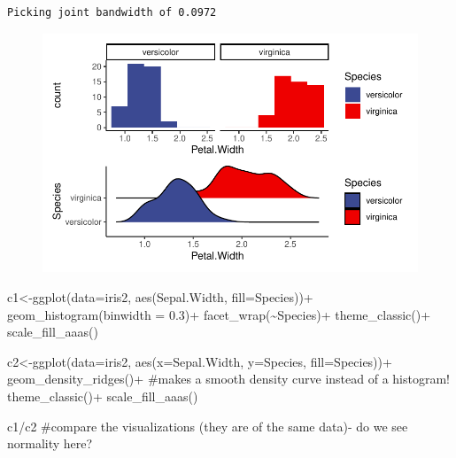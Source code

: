\documentclass[
  letterpaper,
  DIV=11,
  numbers=noendperiod]{scrartcl}
\newenvironment{Shaded}{\begin{snugshade}}{\end{snugshade}}
\newcommand{\AttributeTok}[1]{\textcolor[rgb]{0.40,0.45,0.13}{#1}}
\newcommand{\CommentTok}[1]{\textcolor[rgb]{0.37,0.37,0.37}{#1}}
\newcommand{\FloatTok}[1]{\textcolor[rgb]{0.68,0.00,0.00}{#1}}
\newcommand{\FunctionTok}[1]{\textcolor[rgb]{0.28,0.35,0.67}{#1}}
\newcommand{\NormalTok}[1]{\textcolor[rgb]{0.00,0.23,0.31}{#1}}
\newcommand{\OtherTok}[1]{\textcolor[rgb]{0.00,0.23,0.31}{#1}}
\newcommand{\SpecialCharTok}[1]{\textcolor[rgb]{0.37,0.37,0.37}{#1}}
\begin{document}
\begin{verbatim}
Picking joint bandwidth of 0.0972
\end{verbatim}

\begin{figure}[H]

{\centering \includegraphics{t_test_files/figure-pdf/unnamed-chunk-6-1.pdf}

}

\end{figure}

\begin{Shaded}
\begin{Highlighting}[]
\NormalTok{c1}\OtherTok{\textless{}{-}}\FunctionTok{ggplot}\NormalTok{(}\AttributeTok{data=}\NormalTok{iris2, }\FunctionTok{aes}\NormalTok{(Sepal.Width, }\AttributeTok{fill=}\NormalTok{Species))}\SpecialCharTok{+}
  \FunctionTok{geom\_histogram}\NormalTok{(}\AttributeTok{binwidth =} \FloatTok{0.3}\NormalTok{)}\SpecialCharTok{+} 
  \FunctionTok{facet\_wrap}\NormalTok{(}\SpecialCharTok{\textasciitilde{}}\NormalTok{Species)}\SpecialCharTok{+}
  \FunctionTok{theme\_classic}\NormalTok{()}\SpecialCharTok{+}
  \FunctionTok{scale\_fill\_aaas}\NormalTok{()}

\NormalTok{c2}\OtherTok{\textless{}{-}}\FunctionTok{ggplot}\NormalTok{(}\AttributeTok{data=}\NormalTok{iris2, }\FunctionTok{aes}\NormalTok{(}\AttributeTok{x=}\NormalTok{Sepal.Width, }\AttributeTok{y=}\NormalTok{Species, }\AttributeTok{fill=}\NormalTok{Species))}\SpecialCharTok{+}
  \FunctionTok{geom\_density\_ridges}\NormalTok{()}\SpecialCharTok{+} \CommentTok{\#makes a smooth density curve instead of a histogram!}
  \FunctionTok{theme\_classic}\NormalTok{()}\SpecialCharTok{+}
  \FunctionTok{scale\_fill\_aaas}\NormalTok{()}

\NormalTok{c1}\SpecialCharTok{/}\NormalTok{c2 }\CommentTok{\#compare the visualizations (they are of the same data){-} do we see normality here?}
\end{Highlighting}
\end{Shaded}
\end{document}
